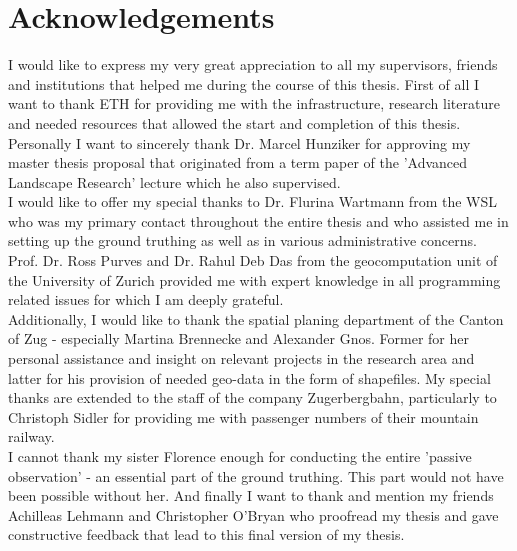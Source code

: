 \cleardoublepage

\chapter*{Acknowledgements} \label{acknowledgements}
I would like to express my very great appreciation to all my supervisors, friends and institutions that helped me during the course of this thesis. First of all I want to thank ETH for providing me with the infrastructure, research literature and needed resources that allowed the start and completion of this thesis.\\
Personally I want to sincerely thank Dr. Marcel Hunziker for approving my master thesis proposal that originated from a term paper of the 'Advanced Landscape Research' lecture which he also supervised. \\
I would like to offer my special thanks to Dr. Flurina Wartmann from the WSL who was my primary contact throughout the entire thesis and who assisted me in setting up the ground truthing as well as in various administrative concerns. \\
Prof. Dr. Ross Purves and Dr. Rahul Deb Das from the geocomputation unit of the University of Zurich provided me with expert knowledge in all programming related issues for which I am deeply grateful.\\
\newline
Additionally, I would like to thank the spatial planing department of the Canton of Zug - especially Martina Brennecke and Alexander Gnos. Former for her personal assistance and insight on relevant projects in the research area and latter for his provision of needed geo-data in the form of shapefiles. My special thanks are extended to the staff of the company Zugerbergbahn, particularly to Christoph Sidler for providing me with passenger numbers of their mountain railway. \\
\newline
I cannot thank my sister Florence enough for conducting the entire 'passive observation' - an essential part of the ground truthing. This part would not have been possible without her. And finally I want to thank and mention my friends Achilleas Lehmann and Christopher O'Bryan who proofread my thesis and gave constructive feedback that lead to this final version of my thesis.

\cleardoublepage

